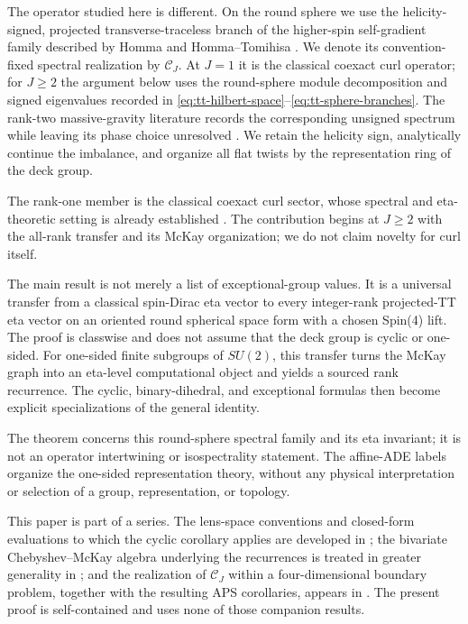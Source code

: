 \documentclass[11pt]{article}
\theoremstyle{definition}
\begin{document}
The operator studied here is different.  On the round sphere we use the
helicity-signed, projected transverse-traceless branch of the higher-spin
self-gradient family described by Homma and Homma--Tomihisa
\cite{Homma2001,HommaTomihisa2021}.  We denote its convention-fixed spectral
realization by $\mathcal C_J$.  At $J=1$ it is the classical coexact curl
operator; for $J\geq2$ the argument below uses the round-sphere module
decomposition and signed eigenvalues recorded in
\eqref{eq:tt-hilbert-space}--\eqref{eq:tt-sphere-branches}.  The rank-two
massive-gravity literature records the corresponding unsigned spectrum while
leaving its phase choice unresolved
\cite{Homma2001,HommaTomihisa2021,CastroLashkariMaloney2011,
BertinGrumillerVassilevichZojer2011}.  We retain the
helicity sign, analytically continue the imbalance, and organize all flat
twists by the representation ring of the deck group.

The rank-one member is the classical coexact curl sector, whose spectral and
eta-theoretic setting is already established \cite{APS1975,Bar2019}.  The
contribution begins at $J\geq2$ with the all-rank transfer and its McKay
organization; we do not claim novelty for curl itself.

The main result is not merely a list of exceptional-group values.  It is a
universal transfer from a classical spin-Dirac eta vector to every
integer-rank projected-TT eta vector on an oriented round spherical space
form with a chosen Spin(4) lift.  The proof is classwise and does not assume
that the deck group is cyclic or one-sided.  For one-sided finite subgroups of
$SU(2)$, this transfer turns the McKay graph into an eta-level computational
object and yields a sourced rank recurrence.  The cyclic, binary-dihedral,
and exceptional formulas then become explicit specializations of the general
identity.

The theorem concerns this round-sphere spectral family and its eta invariant;
it is not an operator intertwining or isospectrality statement.  The
affine-ADE labels organize the one-sided representation theory, without any
physical interpretation or selection of a group, representation, or
topology.

This paper is part of a series.  The lens-space conventions and closed-form
evaluations to which the cyclic corollary applies are developed in
\cite{MahmoodP1Collection2026}; the bivariate Chebyshev--McKay algebra
underlying the recurrences is treated in greater generality in
\cite{MahmoodP4Collection2026}; and the realization of $\mathcal C_J$ within a
four-dimensional boundary problem, together with the resulting APS
corollaries, appears in \cite{MahmoodP7Collection2026}.  The present proof is
self-contained and uses none of those companion results.
\end{document}
